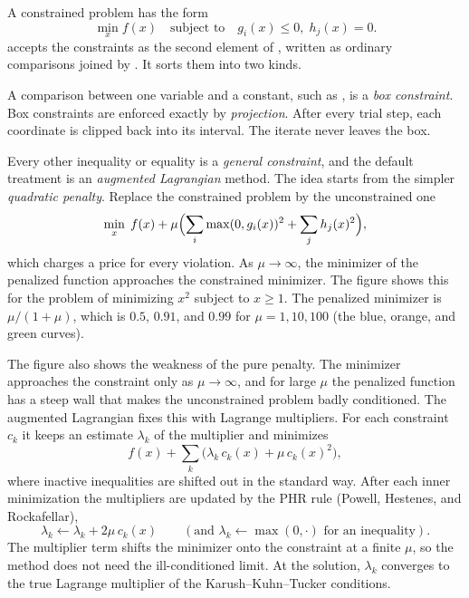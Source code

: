 A constrained problem has the form
\[
  \min_x f(x) \quad \text{subject to} \quad g_i(x) \le 0,\; h_j(x) = 0 .
\]
 accepts the constraints as the second element of
, written as ordinary comparisons joined by \mcode{\&\&}.
It sorts them into two kinds.

A comparison between one variable and a constant, such as ,
is a \emph{box constraint}. Box constraints are enforced
exactly by \emph{projection}. After every trial step, each coordinate is clipped
back into its interval. The iterate never leaves the box.

Every other inequality or equality is a \emph{general constraint}, and the
default treatment is an \emph{augmented Lagrangian}
method. The idea starts from the simpler \emph{quadratic
penalty}. Replace the constrained problem by the
unconstrained one
\[
  \min_x\; f(x) + \mu \Bigl( \sum_i \max(0, g_i(x))^2 + \sum_j h_j(x)^2 \Bigr),
\]
which charges a price for every violation. As \(\mu \to \infty\), the minimizer
of the penalized function approaches the constrained minimizer. The figure shows
this for the problem of minimizing \(x^2\) subject to \(x \ge 1\). The
penalized minimizer is \(\mu/(1 + \mu)\), which is \(0.5\), \(0.91\), and
\(0.99\) for \(\mu = 1, 10, 100\) (the blue, orange, and green curves).


The figure also shows the weakness of the pure penalty. The minimizer
approaches the constraint only as \(\mu \to \infty\), and for large \(\mu\) the
penalized function has a steep wall that makes the unconstrained problem
badly conditioned. The augmented Lagrangian fixes this with Lagrange
multipliers. For each constraint \(c_k\) it keeps an estimate \(\lambda_k\) of
the multiplier and minimizes
\[
  f(x) + \sum_k \bigl(\lambda_k\, c_k(x) + \mu\, c_k(x)^2\bigr),
\]
where inactive inequalities are shifted out in the standard way. After each
inner minimization the multipliers are updated by the PHR rule (Powell,
Hestenes, and Rockafellar),
\[
  \lambda_k \leftarrow \lambda_k + 2\mu\, c_k(x)
  \qquad (\text{and } \lambda_k \leftarrow \max(0, \cdot) \text{ for an inequality}).
\]
The multiplier term shifts the minimizer onto the constraint at a finite
\(\mu\), so the method does not need the ill-conditioned limit. At the
solution, \(\lambda_k\) converges to the true Lagrange multiplier of the
Karush--Kuhn--Tucker conditions.

